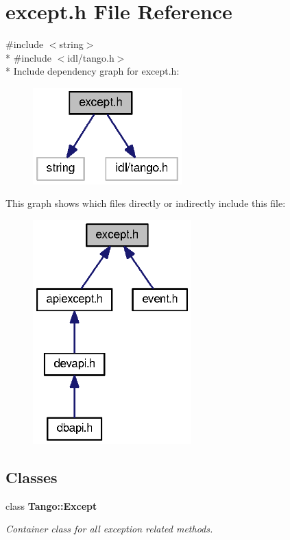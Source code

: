 \section{except.\-h File Reference}
\label{except_8h}
{\ttfamily \#include $<$string$>$}\\*
{\ttfamily \#include $<$idl/tango.\-h$>$}\\*
Include dependency graph for except.\-h\-:
\nopagebreak
\begin{figure}[H]
\begin{center}
\leavevmode
\includegraphics[width=163pt]{dc/d6a/except_8h__incl}
\end{center}
\end{figure}
This graph shows which files directly or indirectly include this file\-:
\nopagebreak
\begin{figure}[H]
\begin{center}
\leavevmode
\includegraphics[width=173pt]{da/da9/except_8h__dep__incl}
\end{center}
\end{figure}
\subsection*{Classes}
\begin{DoxyCompactItemize}
\item 
class {\bf Tango\-::\-Except}
\begin{DoxyCompactList}\small\item\em Container class for all exception related methods. \end{DoxyCompactList}\end{DoxyCompactItemize}

